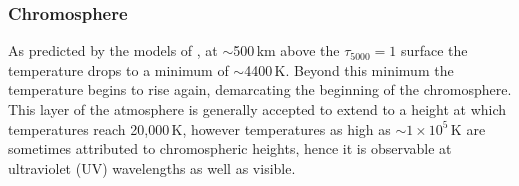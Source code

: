 \subsubsection{Chromosphere}\label{sec:122}

As predicted by the models of \citep{vernazza1981, fontenla1988, gabriel1976}, at $\sim$500\,km above the $\tau_{5000}=1$ surface the temperature drops to a minimum of $\sim$4400\,K. Beyond this minimum the temperature begins to rise again, demarcating the beginning of the chromosphere. This layer of the atmosphere is generally accepted to extend to a height at which temperatures reach 20,000\,K, however temperatures as high as $\sim$$1\times10^5$\,K are sometimes attributed to chromospheric heights, hence it is observable at ultraviolet (UV) wavelengths as well as visible. 


